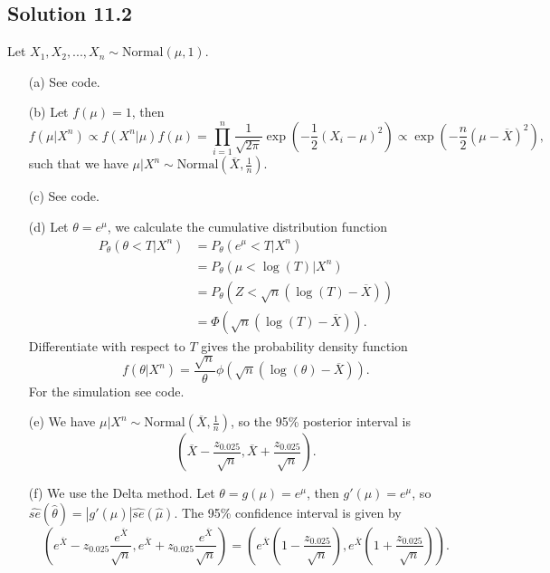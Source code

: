 \subsection*{Solution 11.2}

Let $X_1, X_2, ..., X_n \sim \mathrm{Normal}(\mu, 1)$.

\begin{itemize}
    \item[(a)] See code.
    \item[(b)] Let $f(\mu) = 1$, then
        \begin{equation*}
            f(\mu|X^n) \propto f(X^n|\mu) f(\mu)
                = \prod_{i = 1}^n \frac{1}{\sqrt{2\pi}} \exp\left(-\frac{1}{2}(X_i - \mu)^2\right)
                \propto \exp\left(-\frac{n}{2}(\mu - \overline{X})^2\right),
        \end{equation*}
        such that we have $\mu|X^n \sim \mathrm{Normal}(\overline{X}, \frac{1}{n})$.
    \item[(c)] See code.
    \item[(d)] Let $\theta = e^{\mu}$, we calculate the cumulative distribution function
        \begin{equation*}
            \begin{split}
                P_{\theta}(\theta < T | X^n)
                    &= P_{\theta}(e^{\mu} < T | X^n) \\
                    &= P_{\theta}(\mu < \log(T) | X^n) \\
                    &= P_{\theta}(Z < \sqrt{n}(\log(T) - \overline{X})) \\
                    &= \Phi(\sqrt{n}(\log(T) - \overline{X})).
            \end{split}
        \end{equation*}
        Differentiate with respect to $T$ gives the probability density function
        \begin{equation*}
            f(\theta|X^n) = \frac{\sqrt{n}}{\theta} \phi\left(\sqrt{n}(\log(\theta) - \overline{X})\right).
        \end{equation*}
        For the simulation see code.
    \item[(e)] We have $\mu|X^n \sim \mathrm{Normal}(\overline{X}, \frac{1}{n})$, so the 95\% posterior interval is
        \begin{equation*}
            \left(\overline{X} - \frac{z_{0.025}}{\sqrt{n}}, \overline{X} + \frac{z_{0.025}}{\sqrt{n}}\right).
        \end{equation*}
    \item[(f)] We use the Delta method.
        Let $\theta = g(\mu) = e^{\mu}$, then $g'(\mu) = e^{\mu}$, so $\hat{se}(\hat{\theta}) = |g'(\hat{\mu})|\hat{se}(\hat{\mu})$.
        The 95\% confidence interval is given by
        \begin{equation*}
            \left(e^{\overline{X}} - z_{0.025} \frac{e^{\overline{X}}}{\sqrt{n}}, e^{\overline{X}} + z_{0.025} \frac{e^{\overline{X}}}{\sqrt{n}}\right)
            = \left(e^{\overline{X}}(1 - \frac{z_{0.025}}{\sqrt{n}}), e^{\overline{X}}(1 + \frac{z_{0.025}}{\sqrt{n}})\right).
        \end{equation*}
\end{itemize}
